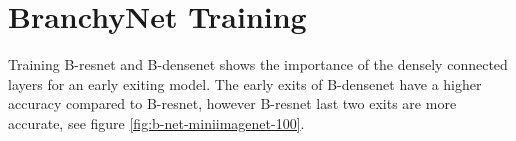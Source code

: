 
\section{BranchyNet Training}


Training B-\gls{resnet} and B-\gls{densenet} shows the importance of the densely connected layers for an early exiting model. The early exits of B-\gls{densenet} have a higher accuracy compared to B-\gls{resnet}, however B-\gls{resnet} last two exits are more accurate, see figure \ref{fig:b-net-miniimagenet-100}. 

\begin{figure}
	\centering
	\captionsetup[subfigure]{justification=centering}
\end{figure}


